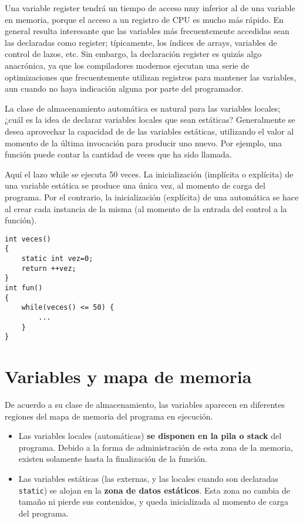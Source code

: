 Una variable register tendrá un tiempo de acceso muy inferior al de una variable en memoria, porque
el acceso a un registro de CPU es mucho más rápido. En general resulta interesante que las variables
más frecuentemente accedidas sean las declaradas como register; típicamente, los índices de arrays,
variables de control de lazos, etc. Sin embargo, la declaración register es quizás algo anacrónica, ya que los compiladores modernos ejecutan una serie de optimizaciones que frecuentemente utilizan registros para mantener las variables, aun cuando
no haya indicación alguna por parte del programador.


La clase de almacenamiento automática es natural para las variables locales; ¿cuál es la idea de declarar variables locales que sean estáticas? Generalmente se desea aprovechar la capacidad de  de las variables estáticas, utilizando el valor al momento de la última invocación para producir uno nuevo. Por ejemplo, una función puede contar la cantidad de veces que ha sido llamada.


\begin{ejemplo}
Aquí el lazo while se ejecuta 50 veces. La inicialización (implícita o explícita) de una variable estática se produce una única vez, al momento de carga del programa. Por el contrario, la inicialización (explícita) de una automática se hace al crear cada instancia de la misma (al momento de la entrada del control a la función).

\begin{lstlisting}
int veces()
{
	static int vez=0;
	return ++vez;
}
int fun()
{
	while(veces() <= 50) {
		...
	}
}
\end{lstlisting}
\end{ejemplo}







\section{Variables y mapa de memoria}

De acuerdo a su clase de almacenamiento, las variables aparecen en diferentes regiones del mapa de
memoria del programa en ejecución.
\begin{itemize}
	\item Las variables locales (automáticas) \textbf{se disponen en la pila o stack} del programa.
Debido a la forma de administración de esta zona de la
memoria, existen solamente hasta la finalización de la
función.
\item Las variables estáticas (las externas, y las locales cuando
son declaradas \texttt{static}) se alojan en la \textbf{zona de datos
estáticos}. Esta zona no cambia de tamaño ni pierde sus
contenidos, y queda inicializada al momento de carga del
programa.
\end{itemize}

